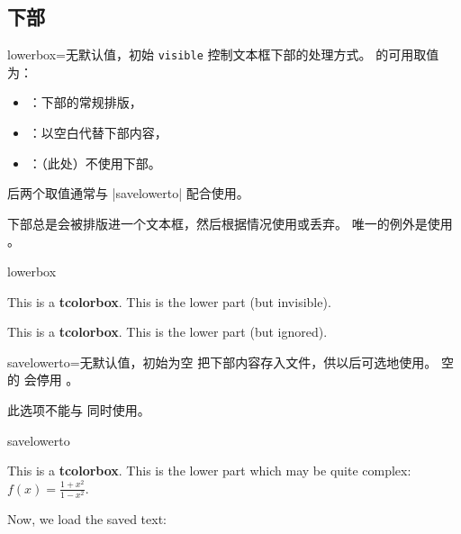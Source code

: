 \subsection{下部}
\begin{docTcbKey}{lowerbox}{=}{无默认值，初始 \texttt{visible}}
  控制文本框下部的处理方式。
   的可用取值为：
  \begin{itemize}
  \item{}：下部的常规排版，
  \item{}：以空白代替下部内容，
  \item{}：（此处）不使用下部。
  \end{itemize}
  后两个取值通常与 |savelowerto| 配合使用。

  \begin{marker}
  下部总是会被排版进一个文本框，然后根据情况使用或丢弃。
  唯一的例外是使用 。
  \end{marker}

\begin{exdispExample}{lowerbox}
\begin{tcolorbox}[lowerbox=invisible,colback=white]
This is a \textbf{tcolorbox}.
\tcblower
This is the lower part (but invisible).
\end{tcolorbox}

\begin{tcolorbox}[lowerbox=ignored,colback=white]
This is a \textbf{tcolorbox}.
\tcblower
This is the lower part (but ignored).
\end{tcolorbox}
\end{exdispExample}
\end{docTcbKey}


\clearpage
\begin{docTcbKey}[][doc updated=2014-11-28]{savelowerto}{=}{无默认值，初始为空}
  把下部内容存入文件，供以后可选地使用。
  空的  会停用 。
  \begin{marker}
  此选项不能与  同时使用。
  \end{marker}

\begin{exdispExample}{savelowerto}
\begin{tcolorbox}[lowerbox=invisible,savelowerto=\jobname_bspsave.tex,colback=white]
This is a \textbf{tcolorbox}.
\tcblower
This is the lower part which may be quite complex:
$\displaystyle f(x)=\frac{1+x^2}{1-x^2}$.
\end{tcolorbox}

Now, we load the saved text:\\

\end{exdispExample}
\end{docTcbKey}


